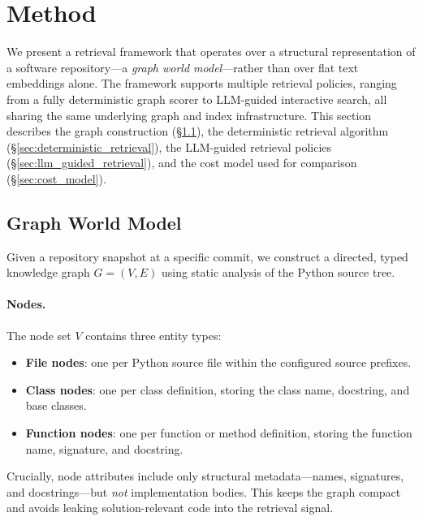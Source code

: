 \section{Method}
\label{sec:method}

We present a retrieval framework that operates over a structural representation of a software repository---a \emph{graph world model}---rather than over flat text embeddings alone. The framework supports multiple retrieval policies, ranging from a fully deterministic graph scorer to LLM-guided interactive search, all sharing the same underlying graph and index infrastructure. This section describes the graph construction (\S\ref{sec:graph_world_model}), the deterministic retrieval algorithm (\S\ref{sec:deterministic_retrieval}), the LLM-guided retrieval policies (\S\ref{sec:llm_guided_retrieval}), and the cost model used for comparison (\S\ref{sec:cost_model}).

\subsection{Graph World Model}
\label{sec:graph_world_model}

Given a repository snapshot at a specific commit, we construct a directed, typed knowledge graph $G = (V, E)$ using static analysis of the Python source tree.

\paragraph{Nodes.}
The node set $V$ contains three entity types:
\begin{itemize}[leftmargin=1.5em]
  \item \textbf{File nodes}: one per Python source file within the configured source prefixes.
  \item \textbf{Class nodes}: one per class definition, storing the class name, docstring, and base classes.
  \item \textbf{Function nodes}: one per function or method definition, storing the function name, signature, and docstring.
\end{itemize}
Crucially, node attributes include only structural metadata---names, signatures, and docstrings---but \emph{not} implementation bodies. This keeps the graph compact and avoids leaking solution-relevant code into the retrieval signal.

